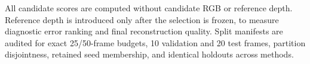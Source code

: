 All candidate scores are computed without candidate RGB or reference depth.
Reference depth is introduced only after the selection is frozen, to measure
diagnostic error ranking and final reconstruction quality.  Split manifests
are audited for exact 25/50-frame budgets, 10 validation and 20 test frames,
partition disjointness, retained seed membership, and identical holdouts across
methods.
